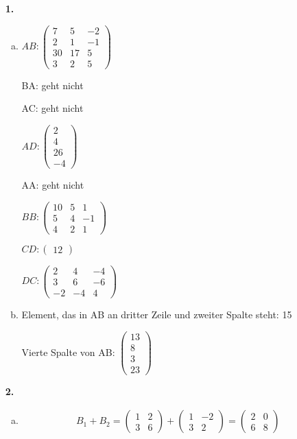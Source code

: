 \documentclass[a4paper]{scrartcl}
\title{\titleinfo}
\author{Elena Noll, Sven-Hendrik Haase, Arne Feil}
\date{\today}
\begin{document}
\maketitle

\begin{enumerate}
\item[\textbf{1.}]
\begin{enumerate}[a)]
\item
$AB:\begin{pmatrix}
7 & 5 & -2 \\
2 & 1 & -1 \\
30 & 17 & 5 \\
3 & 2 & 5
\end{pmatrix}$

BA: geht nicht

AC: geht nicht

$AD:\begin{pmatrix}
2 \\
4 \\
26 \\
-4
\end{pmatrix}$

AA: geht nicht

$BB:\begin{pmatrix}
10 & 5 & 1 \\
5 & 4 & -1 \\
4 & 2 & 1
\end{pmatrix}$

$CD:\begin{pmatrix}
12
\end{pmatrix}$

$DC:\begin{pmatrix}
2 & 4 & -4 \\
3 & 6 & -6 \\
-2 & -4 & 4
\end{pmatrix}$

\item
Element, das in AB an dritter Zeile und zweiter Spalte steht: 15

Vierte Spalte von AB: $\begin{pmatrix}
13 \\
8 \\
3 \\
23
\end{pmatrix}$
\end{enumerate}

\item[\textbf{2.}]
\begin{enumerate}[a)]
\item
\begin{align*}
B_1 + B_2 =
\begin{pmatrix}
1 & 2 \\
3 & 6
\end{pmatrix}
+
\begin{pmatrix}
1 & -2 \\
3 & 2
\end{pmatrix}
=
\begin{pmatrix}
2 & 0 \\
6 & 8
\end{pmatrix}
\end{align*}


\end{enumerate}
\end{enumerate}
\end{document}
